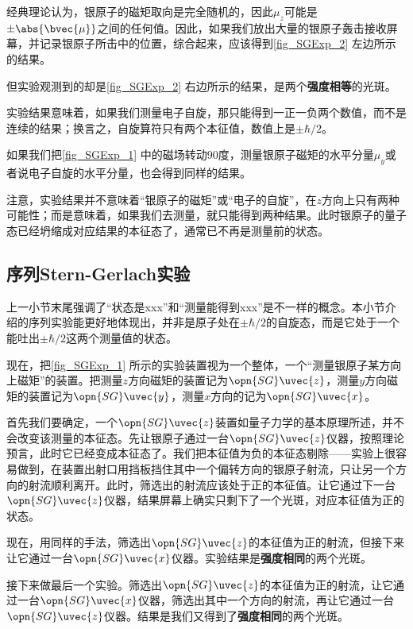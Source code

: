 经典理论认为，银原子的磁矩取向是完全随机的，因此$\mu_z$可能是$\pm\abs{\bvec{\mu}}$之间的任何值。因此，如果我们放出大量的银原子轰击接收屏幕，并记录银原子所击中的位置，综合起来，应该得到\autoref{fig_SGExp_2} 左边所示的结果。

但实验观测到的却是\autoref{fig_SGExp_2} 右边所示的结果，是两个\textbf{强度相等}的光斑。

实验结果意味着，如果我们测量电子自旋，那只能得到一正一负两个数值，而不是连续的结果；换言之，自旋算符只有两个本征值，数值上是$\pm\hbar/2$。

如果我们把\autoref{fig_SGExp_1} 中的磁场转动90度，测量银原子磁矩的水平分量$\mu_y$或者说电子自旋的水平分量，也会得到同样的结果。

注意，实验结果并不意味着“银原子的磁矩”或“电子的自旋”，在$z$方向上只有两种可能性；而是意味着，如果我们去测量，就只能得到两种结果。此时银原子的量子态已经坍缩成对应结果的本征态了，通常已不再是测量前的状态。

\subsection{序列Stern-Gerlach实验}\label{sub_SGExp_1}

上一小节末尾强调了“状态是xxx”和“测量能得到xxx”是不一样的概念。本小节介绍的序列实验能更好地体现出，并非是原子处在$\pm\hbar/2$的自旋态，而是它处于一个能吐出$\pm\hbar/2$这两个测量值的状态。

现在，把\autoref{fig_SGExp_1} 所示的实验装置视为一个整体，一个“测量银原子某方向上磁矩”的装置。把测量$z$方向磁矩的装置记为$\opn{SG}\uvec{z}$，测量$y$方向磁矩的装置记为$\opn{SG}\uvec{y}$，测量$x$方向的记为$\opn{SG}\uvec{x}$。

首先我们要确定，一个$\opn{SG}\uvec{z}$装置如量子力学的基本原理所述，并不会改变该测量的本征态。先让银原子通过一台$\opn{SG}\uvec{z}$仪器，按照理论预言，此时它已经变成本征态了。我们把本征值为负的本征态剔除——实验上很容易做到，在装置出射口用挡板挡住其中一个偏转方向的银原子射流，只让另一个方向的射流顺利离开。此时，筛选出的射流应该处于正的本征值。让它通过下一台$\opn{SG}\uvec{z}$仪器，结果屏幕上确实只剩下了一个光斑，对应本征值为正的状态。

现在，用同样的手法，筛选出$\opn{SG}\uvec{z}$的本征值为正的射流，但接下来让它通过一台$\opn{SG}\uvec{x}$仪器。实验结果是\textbf{强度相同}的两个光斑。

接下来做最后一个实验。筛选出$\opn{SG}\uvec{z}$的本征值为正的射流，让它通过一台$\opn{SG}\uvec{x}$仪器，筛选出其中一个方向的射流，再让它通过一台$\opn{SG}\uvec{z}$仪器。结果是我们又得到了\textbf{强度相同}的两个光斑。




